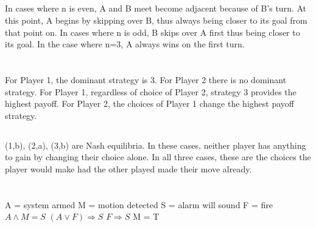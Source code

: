 \documentclass[a4paper]{article}
\begin{document}
\subsection{}
In cases where n is even, A and B meet become adjacent because of B's turn. At this point, A begins by skipping over B, thus always being closer to its goal from that point on. 
In cases where n is odd, B skips over A first thus being closer to its goal. 
In the case where n=3, A always wins on the first turn.

\section{}
\subsection{}
For Player 1, the dominant strategy is 3. For Player 2 there is no dominant strategy. For Player 1, regardless of choice of Player 2, strategy 3 provides the highest payoff. For Player 2, the choices of Player 1 change the highest payoff strategy. 
\subsection{}
(1,b), (2,a), (3,b) are Nash equilibria. In these cases, neither player has anything to gain by changing their choice alone. In all three cases, these are the choices the player would make had the other played made their move already. 

\section{}
\subsection{}
A = system armed \newline
M = motion detected \newline
S = alarm will sound \newline
F = fire \newline
\newline
\newline
${A \land M = S}$ \newline
${(A \lor F) \Rightarrow S}$ \newline
${F \Rightarrow S}$ \newline
M = T \newline

\subsection{}
\end{document}
